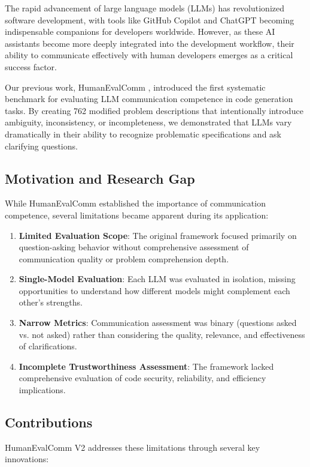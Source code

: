 \documentclass[conference]{IEEEtran}
\begin{document}
The rapid advancement of large language models (LLMs) has revolutionized software development, with tools like GitHub Copilot and ChatGPT becoming indispensable companions for developers worldwide. However, as these AI assistants become more deeply integrated into the development workflow, their ability to communicate effectively with human developers emerges as a critical success factor.

Our previous work, HumanEvalComm \cite{wu2025humanevalcomm}, introduced the first systematic benchmark for evaluating LLM communication competence in code generation tasks. By creating 762 modified problem descriptions that intentionally introduce ambiguity, inconsistency, or incompleteness, we demonstrated that LLMs vary dramatically in their ability to recognize problematic specifications and ask clarifying questions.

\subsection{Motivation and Research Gap}

While HumanEvalComm established the importance of communication competence, several limitations became apparent during its application:

\begin{enumerate}
    \item \textbf{Limited Evaluation Scope}: The original framework focused primarily on question-asking behavior without comprehensive assessment of communication quality or problem comprehension depth.
    \item \textbf{Single-Model Evaluation}: Each LLM was evaluated in isolation, missing opportunities to understand how different models might complement each other's strengths.
    \item \textbf{Narrow Metrics}: Communication assessment was binary (questions asked vs. not asked) rather than considering the quality, relevance, and effectiveness of clarifications.
    \item \textbf{Incomplete Trustworthiness Assessment}: The framework lacked comprehensive evaluation of code security, reliability, and efficiency implications.
\end{enumerate}

\subsection{Contributions}

HumanEvalComm V2 addresses these limitations through several key innovations:
\end{document}
